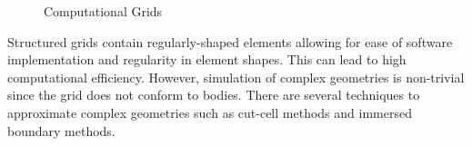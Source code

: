 \documentclass[11pt]{book}
\begin{document}
\begin{figure}[h]
 \begin{subfigmatrix}{2}%
 \end{subfigmatrix}
 \caption{Computational Grids}
 \label{grid-types}
\end{figure}

Structured grids contain regularly-shaped elements allowing for ease of software implementation and regularity in element shapes.
This can lead to high computational efficiency.
However, simulation of complex geometries is non-trivial since the grid does not conform to bodies. 
There are several techniques to approximate complex geometries such as cut-cell methods and immersed boundary methods.
\medskip
\end{document}
